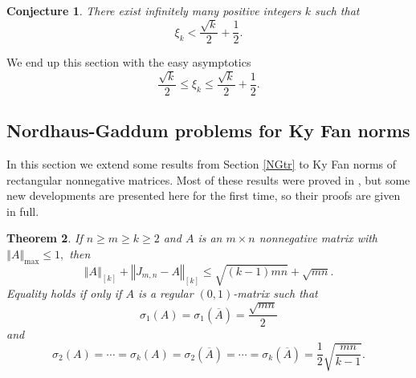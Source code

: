 \documentclass[12pt]{article}%
\newtheorem{theorem}{Theorem}[section]
\newtheorem{conjecture}[theorem]{Conjecture}
\begin{document}
\begin{conjecture}
There exist infinitely many positive integers $k$ such that
\[
\xi_{k}<\frac{\sqrt{k}}{2}+\frac{1}{2}.
\]

\end{conjecture}

We end up this section with the easy asymptotics%
\[
\frac{\sqrt{k}}{2}\leq\xi_{k}\leq\frac{\sqrt{k}}{2}+\frac{1}{2}.
\]


\subsection{\label{FD}Nordhaus-Gaddum problems for Ky Fan norms}

In this section we extend some results from Section \ref{NGtr} to Ky Fan norms
of rectangular nonnegative matrices. Most of these results were proved in
\cite{NiYu13}, but some new developments are presented here for the first
time, so their proofs are given in full.

\begin{theorem}
\label{NG3}If $n\geq m\geq k\geq2$ and $A$ is an $m\times n$ nonnegative
matrix with $\left\Vert A\right\Vert _{\max}\leq1,$ then
\begin{equation}
\left\Vert A\right\Vert _{\left[  k\right]  }+\left\Vert J_{m,n}-A\right\Vert
_{\left[  k\right]  }\leq\sqrt{\left(  k-1\right)  mn}+\sqrt{mn}.
\label{th3in}%
\end{equation}
Equality holds if only if $A$ is a regular $\left(  0,1\right)  $-matrix such
that%
\[
\sigma_{1}(A)=\sigma_{1}(\overline{A})=\frac{\sqrt{mn}}{2}%
\]
and
\begin{equation}
\sigma_{2}(A)=\cdots=\sigma_{k}(A)=\sigma_{2}(\overline{A})=\cdots=\sigma
_{k}(\overline{A})=\frac{1}{2}\sqrt{\frac{mn}{k-1}}. \label{eqs}%
\end{equation}

\end{theorem}
\end{document}
